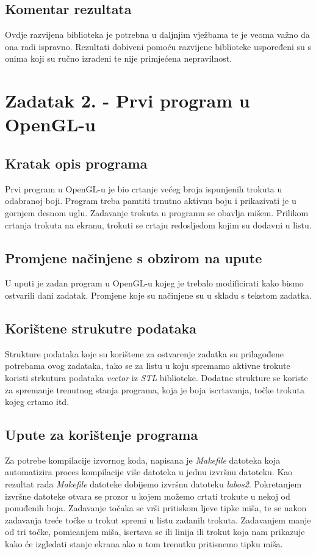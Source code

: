 \documentclass[oneside]{scrbook}
\begin{document}
\subsection{Komentar rezultata}
Ovdje razvijena biblioteka je potrebna u daljnjim vježbama te je veoma važno da ona radi ispravno.  Rezultati dobiveni pomoću razvijene biblioteke uspoređeni su s onima koji su ručno izrađeni te nije primjećena nepravilnost.
 
\section{Zadatak 2. - Prvi program u OpenGL-u}
\subsection{Kratak opis programa}
Prvi program u OpenGL-u je bio crtanje većeg broja ispunjenih trokuta u odabranoj boji. Program treba pamtiti trnutno aktivnu boju i prikazivati je u gornjem desnom uglu. Zadavanje trokuta u programu se obavlja mišem. Prilikom crtanja trokuta na ekranu, trokuti se crtaju redosljedom kojim su dodavni u listu.

\subsection{Promjene načinjene s obzirom na upute}
U uputi je zadan program u OpenGL-u kojeg je trebalo modificirati kako bismo ostvarili dani zadatak. Promjene koje su načinjene su u skladu s tekstom zadatka.

\subsection{Korištene strukutre podataka}
Strukture podataka koje su korištene za ostvarenje zadatka su prilagođene potrebama ovog zadataka, tako se za listu u koju spremamo aktivne trokute koristi strkutura podataka \textit{vector} iz \textit{STL} biblioteke. Dodatne strukture se koriste za spremanje trenutnog stanja programa, koja je boja iscrtavanja, točke trokuta kojeg crtamo itd.

\subsection{Upute za korištenje programa}
Za potrebe kompilacije izvornog koda, napisana je \textit{Makefile} datoteka koja automatizira proces kompilacije više datoteka u jednu izvršnu datoteku. Kao rezultat rada \textit{Makefile} datoteke dobijemo izvršnu datoteku \textit{labos2}. Pokretanjem izvršne datoteke otvara se prozor   u kojem možemo crtati trokute u nekoj od ponuđenih boja. Zadavanje točaka se vrši pritiskom ljeve tipke miša, te se nakon zadavanja treće točke u trokut spremi u listu zadanih trokuta. Zadavanjem manje od tri točke, pomicanjem miša, iscrtava se ili linija ili trokut koja nam prikazuje kako će izgledati stanje ekrana ako u tom trenutku pritisnemo tipku miša.
\end{document}
